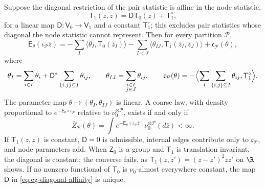 Suppose the diagonal restriction of the pair statistic is affine in the node
statistic,
\begin{equation}
\mathsf T_1(z,z)=\mathsf D \mathsf T_0(z)+\mathsf T_1^\circ,
\label{eq:cg-diagonal-affinity}
\end{equation}
for a linear map \(\mathsf D:\mathsf V_0\to\mathsf V_1\) and a constant
\(\mathsf T_1^\circ\); this excludes pair statistics whose diagonal the node statistic
cannot represent. Then for every partition \(\mathcal P\),
\begin{equation}
\mathsf E_\theta(\iota_{\mathcal P}\bar z)
=-\sum_I\langle\theta_I,\mathsf T_0(\bar z_I)\rangle
-\sum_{I<J}\langle\theta_{IJ},\mathsf T_1(\bar z_I,\bar z_J)\rangle
+\mathfrak c_{\mathcal P}(\theta),
\label{eq:cg-coarse-energy}
\end{equation}
where
\begin{equation}
\theta_I=\sum_{i\in I}\theta_i
+\mathsf D^\ast\sum_{\{i,j\}\subseteq I}\theta_{ij},
\qquad
\theta_{IJ}=\sum_{\substack{i\in I\\j\in J}}\theta_{ij},
\qquad
\mathfrak c_{\mathcal P}(\theta)
=-\Bigl\langle\sum_I\sum_{\{i,j\}\subseteq I}\theta_{ij},\mathsf T_1^\circ\Bigr\rangle .
\label{eq:cg-coarse-parameters}
\end{equation}
The parameter map \(\theta\mapsto(\theta_I,\theta_{IJ})\) is linear. A coarse
law, with density proportional to \(e^{-\mathsf E_\theta\circ\iota_{\mathcal P}}\)
relative to \(\nu_0^{\otimes\mathcal P}\), exists if and only if
\begin{equation}
\bar Z_{\mathcal P}(\theta)
=\int e^{-\mathsf E_\theta(\iota_{\mathcal P}\bar z)}
\nu_0^{\otimes\mathcal P}(d\bar z)<\infty .
\label{eq:cg-coarse-normalizer}
\end{equation}
If \(\mathsf T_1(z,z)\) is constant, \(\mathsf D=0\) is admissible, internal edges
contribute only to \(\mathfrak c_{\mathcal P}\), and node parameters add. When
\(\mathsf Z_0\) is a group and \(\mathsf T_1\) is translation invariant, the diagonal
is constant; the converse fails, as \(\mathsf T_1(z,z')=(z-z')^2zz'\) on \(\R\) shows.
If no nonzero functional of \(\mathsf T_0\) is \(\nu_0\)-almost everywhere constant,
the map \(\mathsf D\) in \eqref{eq:cg-diagonal-affinity} is unique.


